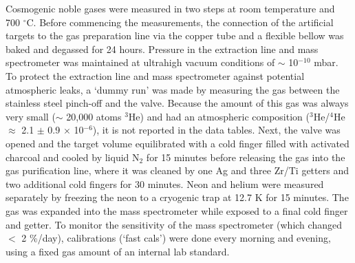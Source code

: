 \documentclass{article}
\begin{document}
Cosmogenic noble gases were measured  in two steps at room temperature
and  700   $^{\circ}$C.   Before  commencing   the  measurements,  the
connection of the  artificial targets to the gas  preparation line via
the copper  tube and a flexible  bellow was baked and  degassed for 24
hours.   Pressure in  the extraction  line and  mass  spectrometer was
maintained at  ultrahigh vacuum conditions of  $\sim$ 10$^{-10}$ mbar.
To protect the extraction line and mass spectrometer against potential
atmospheric leaks, a `dummy run' was made by measuring the gas between
the stainless  steel pinch-off and  the valve.  Because the  amount of
this gas was always very small ($\sim$ 20,000 atoms $^3$He) and had an
atmospheric  composition   ($^3$He/$^4$He  $\approx$  2.1   $\pm$  0.9
$\times$ 10$^{-6}$), it is not reported in the data tables.  Next, the
valve was opened and the target volume equilibrated with a cold finger
filled  with activated  charcoal and  cooled  by liquid  N$_2$ for  15
minutes before releasing the gas into the gas purification line, where
it was  cleaned by one Ag  and three Zr/Ti getters  and two additional
cold fingers for 30 minutes.  Neon and helium were measured separately
by freezing  the neon to  a cryogenic trap  at 12.7 K for  15 minutes.
The gas  was expanded  into the mass  spectrometer while exposed  to a
final cold finger and getter.   To monitor the sensitivity of the mass
spectrometer (which changed $<$  2 \%/day), calibrations (`fast cals')
were done  every morning and evening,  using a fixed gas  amount of an
internal lab standard.  \\
\end{document}

